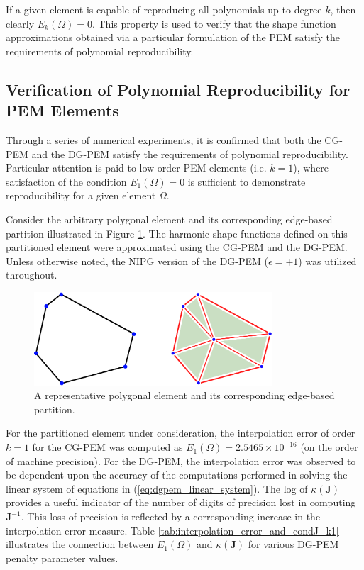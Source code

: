 If a given element is capable of reproducing all polynomials up to degree $k$, then clearly $E_k(\Omega) = 0$. This property is used to verify that the shape function approximations obtained via a particular formulation of the PEM satisfy the requirements of polynomial reproducibility.

\subsection*{Verification of Polynomial Reproducibility for PEM Elements}

Through a series of numerical experiments, it is confirmed that both the CG-PEM and the DG-PEM satisfy the requirements of polynomial reproducibility. Particular attention is paid to low-order PEM elements (i.e. $k=1$), where satisfaction of the condition $E_1 (\Omega) = 0$ is sufficient to demonstrate reproducibility for a given element $\Omega$.

Consider the arbitrary polygonal element and its corresponding edge-based partition illustrated in Figure \ref{fig:reproducing_element_shape}. The harmonic shape functions defined on this partitioned element were approximated using the CG-PEM and the DG-PEM. Unless otherwise noted, the NIPG version of the DG-PEM ($\epsilon = +1$) was utilized throughout.

\begin{figure}[!h]
  \centering
  \includegraphics[width=3.5in]{figures/reproducing_element_shape.pdf}  \caption{A representative polygonal element and its corresponding edge-based partition.}
  \label{fig:reproducing_element_shape}
\end{figure}

For the partitioned element under consideration, the interpolation error of order $k=1$ for the CG-PEM was computed as $E_1 (\Omega) = 2.5465 \times 10^{-16}$ (on the order of machine precision). For the DG-PEM, the interpolation error was observed to be dependent upon the accuracy of the computations performed in solving the linear system of equations in (\ref{eq:dgpem_linear_system}). The log of $\kappa(\bm{J})$ provides a useful indicator of the number of digits of precision lost in computing $\bm{J}^{-1}$. This loss of precision is reflected by a corresponding increase in the interpolation error measure. Table \ref{tab:interpolation_error_and_condJ_k1} illustrates the connection between $E_1 (\Omega)$ and $\kappa(\bm{J})$ for various DG-PEM penalty parameter values. 

